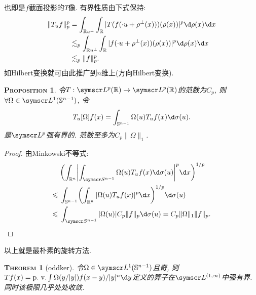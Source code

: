 \documentclass{ctexart}
\makeatletter
\newcommand\<{\@ifstar\@angle@star\@angle@nostar}
\newtheorem{theorem}{{\scshape Theorem}}[section]
\newtheorem{prop}{{\scshape Proposition}}[section]
\def\pv{\mathop{\textup{p.\ v.}}}
\makeatother
\begin{document}
也即是$f$截面投影的$T$像. 有界性质由下式保持:
\[\begin{aligned}
        \|T_uf\|_p^p & =\int_{\mathbb Ru^\bot}\int_{\mathbb R}|T(f(\cdot u + \rho ^\bot(x)))(\rho (x))|^p\d \rho (x)\d x        \\
                     & \lesssim_p \int_{\mathbb Ru^\bot}\int_{\mathbb R}|f(\cdot u + \rho ^\bot(x))(\rho (x))|^p\d \rho (x)\d x \\
                     & \lesssim_p \|f\|_p^p.
    \end{aligned}\]
如Hilbert变换就可由此推广到$n$维上(方向Hilbert变换).
\begin{prop}\label{无用的}
    令$T:\symscr L^p(\mathbb R)\to \symscr L^p(\mathbb R)$的范数为$C_p$, 则$\forall \Omega\in\symscr L^1(\mathbb S^{n-1})$, 令
    \[T_u[\Omega]f(x) = \int_{\mathbb S^{n-1}}\Omega (u)T_uf(x)\d \sigma (u).\]
    是$\symscr L^p$强有界的. 范数至多为$C_p\|\Omega\|_1$.
\end{prop}
\begin{proof}
    由Minkowski不等式:
    \[\begin{aligned}
                         & \biggl( \int_{\mathbb R^n}\biggl| \int_{\symscr S^{n-1}}\Omega (u)T_uf(x)\d \sigma (u) \biggr|^p \d x \biggr)^{1 / p} \\
            \leqslant {} & \int_{\mathbb S^{n-1}}\biggl(\int_{\mathbb R^n} |\Omega (u)T_uf(x)|^p\d x\biggr) ^{ 1/p}\d \sigma (u)                 \\
            \leqslant {} & \int_{\symscr S^{n-1}}|\Omega (u)|C_p\|f\|_p\d \sigma (u)=C_p\|\Omega \|_1\|f\|_p.\qedhere
        \end{aligned}\]
\end{proof}
以上就是最朴素的旋转方法.
\begin{theorem}[oddker]
    令$\Omega \in\symscr L^1(\mathbb S^{n-1})$且奇, 则$Tf(x)=\pv\int \Omega (y/|y|)f(x-y) / |y|^n\d y$定义的算子在$\symscr L^{(1,\infty)}$中强有界. 同时该极限几乎处处收敛.
\end{theorem}
\end{document}
